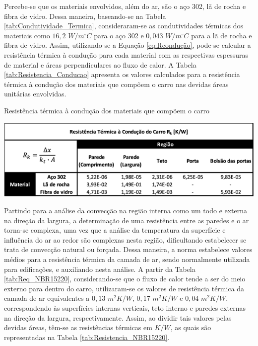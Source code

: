 \documentclass[acronym,symbols,table]{fei}
\begin{document}
Percebe-se que os materiais envolvidos, além do ar, são o aço 302, lã de rocha e fibra de vidro. Dessa maneira, baseando-se na Tabela \ref{tab:Condutividade_Termica}, consideraram-se as condutividades térmicas dos materiais como $16,2$ $W/m^\circ C$ para o aço 302 e $0,043$ $W/m^\circ C$ para a lã de rocha e fibra de vidro. Assim, utilizando-se a Equação \ref{eq:Rcondução}, pode-se calcular a resistência térmica à condução para cada material com as respectivas espessuras de material e áreas perpendiculares ao fluxo de calor. A Tabela \ref{tab:Resistencia_Conducao} apresenta os valores calculados para a resistência térmica à condução dos materiais que compõem o carro nas devidas áreas unitárias envolvidas.

\begin{table}[!htb]
 \centering
    \caption{Resistência térmica à condução dos materiais que compõem o carro}
    \includegraphics[width=0.9\linewidth]{Tabelas/Resistencia_Conducao.png}
    \label{tab:Resistencia_Conducao}
\end{table}

Partindo para a análise da convecção na região interna como um todo e externa na direção da largura, a determinação de uma resistência entre as paredes e o ar torna-se complexa, uma vez que a análise da temperatura da superfície e influência do ar ao redor são complexas nesta região, dificultando estabelecer se trata de convecção natural ou forçada. Dessa maneira, a norma \textcite{abnt15220} estabelece valores médios para a resistência térmica da camada de ar, sendo normalmente utilizada para edificações, e auxiliando nesta análise. A partir da Tabela \ref{tab:Req_NBR15220}, considerando-se que o fluxo de calor tende a ser do meio externo para dentro do carro, utilizaram-se os valores de resistência térmica da camada de ar equivalentes a $0,13$ $m^2K/W$, $0,17$ $m^2K/W$ e $0,04$ $m^2K/W$, correspondendo às superfícies internas verticais, teto interno e paredes externas na direção da largura, respectivamente. Assim, ao dividir tais valores pelas devidas áreas, têm-se as resistências térmicas em $K/W$, as quais são representadas na Tabela \ref{tab:Resistencia_NBR15220}.
\end{document}
